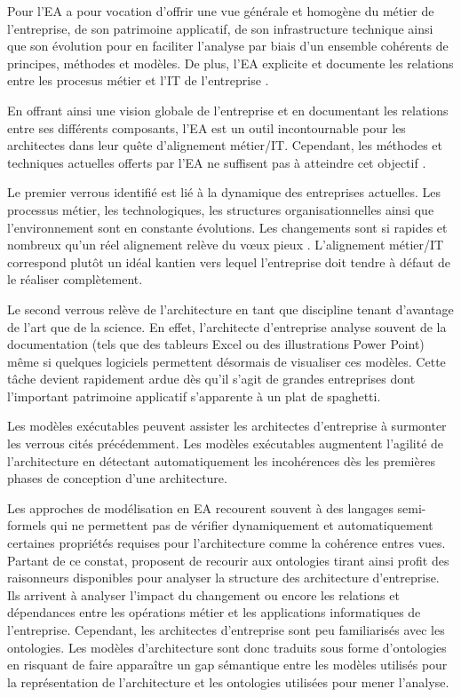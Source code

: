 	Pour \cite{lankhorst2013enterprise} l'EA a pour vocation d'offrir une vue 
générale et homogène du métier de l'entreprise, de son patrimoine applicatif, de 
son infrastructure technique ainsi que son évolution pour en faciliter l'analyse 
par biais d'un ensemble cohérents de principes, méthodes et modèles. De plus, 
l'EA explicite et documente les relations entre les procesus métier et l'IT de 
l'entreprise \cite{kaisler_enterprise_2005}. 
	
	En offrant ainsi une vision globale de l'entreprise et en documentant les 
relations entre ses différents composants, l'EA est un outil incontournable pour 
les architectes dans leur quête d'alignement métier/IT. Cependant, les méthodes 
et techniques actuelles offerts par l'EA ne suffisent pas à atteindre cet 
objectif \cite{barn2013enterprise}. 
	
	Le premier verrous identifié est lié à la dynamique des entreprises actuelles. 
Les processus métier, les technologiques, les structures organisationnelles 
ainsi que l'environnement sont en constante évolutions. Les changements sont si 
rapides et nombreux qu'un réel alignement relève du vœux pieux 
\cite{lankhorst2013enterprise}. L'alignement métier/IT correspond plutôt un 
idéal kantien vers lequel l'entreprise doit tendre à défaut de le réaliser 
complètement.
	
	Le second verrous relève de l'architecture en tant que discipline tenant 
d'avantage de l'art que de la science. En effet, l'architecte d'entreprise 
analyse souvent de la documentation (tels que des tableurs Excel ou des 
illustrations Power Point) même si quelques logiciels permettent désormais de 
visualiser ces modèles. Cette tâche devient rapidement ardue dès qu'il s'agit de 
grandes entreprises dont l'important patrimoine applicatif s'apparente à un plat 
de spaghetti.
	
	Les modèles exécutables peuvent assister les architectes d'entreprise à 
surmonter les verrous cités précédemment. Les modèles exécutables augmentent 
l'agilité de l'architecture en détectant automatiquement les incohérences dès 
les premières phases de conception d'une architecture. 
	
	Les approches de modélisation en EA recourent souvent à des langages 
semi-formels qui ne permettent pas de vérifier dynamiquement et automatiquement 
certaines propriétés requises pour l'architecture comme la cohérence entres 
vues. Partant de ce constat, \cite{sunkle_analyzing_2013} proposent de recourir 
aux ontologies tirant ainsi profit des raisonneurs disponibles pour analyser la 
structure des architecture d'entreprise. Ils arrivent à analyser l'impact du 
changement ou encore les relations et dépendances entre les opérations métier et 
les applications informatiques de l'entreprise. Cependant, les architectes 
d'entreprise sont peu familiarisés avec les ontologies. Les modèles 
d'architecture sont donc traduits sous forme d'ontologies en risquant de faire 
apparaître un gap sémantique entre les modèles utilisés pour la représentation 
de l'architecture et les ontologies utilisées pour mener l'analyse.
	
